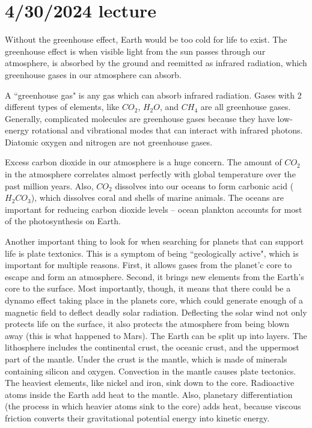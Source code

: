 \documentclass[class=article, crop=false]{standalone}
\begin{document}
\section{4/30/2024 lecture}
Without the greenhouse effect, Earth would be too cold for life to exist. The greenhouse effect is when visible light from the sun passes through our atmosphere, is absorbed by the ground and reemitted as infrared radiation, which greenhouse gases in our atmosphere can absorb.
\par
A ``greenhouse gas" is any gas which can absorb infrared radiation. Gases with 2 different types of elements, like $CO_2$, $H_2O$, and $CH_4$ are all greenhouse gases. Generally, complicated molecules are greenhouse gases because they have low-energy rotational and vibrational modes that can interact with infrared photons. Diatomic oxygen and nitrogen are not greenhouse gases.
\par
Excess carbon dioxide in our atmosphere is a huge concern. The amount of $CO_2$ in the atmosphere correlates almost perfectly with global temperature over the past million years. Also, $CO_2$ dissolves into our oceans to form carbonic acid ($H_2CO_3$), which dissolves coral and shells of marine animals. The oceans are important for reducing carbon dioxide levels -- ocean plankton accounts for most of the photosynthesis on Earth.
\par
Another important thing to look for when searching for planets that can support life is plate textonics. This is a symptom of being ``geologically active", which is important for multiple reasons. First, it allows gases from the planet'c core to escape and form an atmosphere. Second, it brings new elements from the Earth's core to the surface. Most importantly, though, it means that there could be a dynamo effect taking place in the planets core, which could generate enough of a magnetic field to deflect deadly solar radiation. Deflecting the solar wind not only protects life on the surface, it also protects the atmosphere from being blown away (this is what happened to Mars).
The Earth can be split up into layers. The lithosphere includes the continental crust, the oceanic crust, and the uppermost part of the mantle. Under the crust is the mantle, which is made of minerals containing silicon and oxygen. Convection in the mantle causes plate tectonics. The heaviest elements, like nickel and iron, sink down to the core. Radioactive atoms inside the Earth add heat to the mantle. Also, planetary differentiation (the process in which heavier atoms sink to the core) adds heat, because viscous friction converts their gravitational potential energy into kinetic energy.
\end{document}
